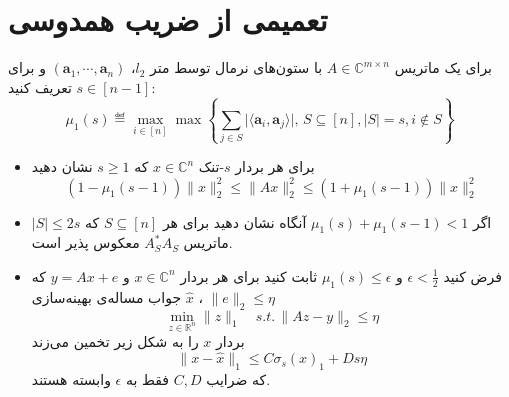 \section{تعمیمی از ضریب همدوسی}
برای یک ماتریس 
$A\in\mathbb{C}^{m\times n}$
با ستون‌های نرمال توسط متر $l_{2}$، 
$(\boldsymbol{a}_{1},\cdots,\boldsymbol{a}_{n})$
و برای $s\in[n-1]$ تعریف کنید:
\[
\mu_{1}(s)\eqdef\max_{i\in[n]}\max\left\lbrace\sum_{j\in S}\big\lvert\langle \boldsymbol{a}_{i},\boldsymbol{a}_{j}\rangle\big\rvert,\,S\subseteq[n],|S|=s,i\notin S\right\rbrace
\]

\begin{itemize}
\item 
 برای هر بردار $s$-تنک
$x\in\mathbb{C}^{n}$
که $s\ge1$ نشان دهید
\[
(1-\mu_{1}(s-1))\|x\|_{2}^{2}\le\|Ax\|_{2}^{2}\le (1+\mu_{1}(s-1))\|x\|_{2}^{2}
\]
\item 
اگر 
$\mu_{1}(s)+\mu_{1}(s-1)<1$
آنگاه نشان دهید برای هر 
$S\subseteq[n]$
که 
$|S|\le2s$
ماتریس 
$A_{S}^{*}A_{S}$
معکوس پذیر است.

\item 
 فرض کنید 
$\epsilon<\frac{1}{2}$
و 
$\mu_{1}(s)\le\epsilon$
ثابت کنید برای هر بردار $x\in\mathbb{C}^{n}$ و 
$y=Ax+e$
که 
$\|e\|_{2}\le\eta$
،
$\hat{x}$
جواب مساله‌ی بهینه‌سازی 
\[
\min_{z\in\mathbb{R}^{n}}\|z\|_{1}\quad s.t.\,\|Az-y\|_{2}\le\eta
\] 
بردار $x$ را به شکل زیر تخمین می‌زند
\[
\|x-\hat{x}\|_{1}\le C\sigma_{s}(x)_{1}+Ds\eta
\]
که ضرایب $C,D$ فقط به $\epsilon$ وابسته هستند.
\end{itemize}